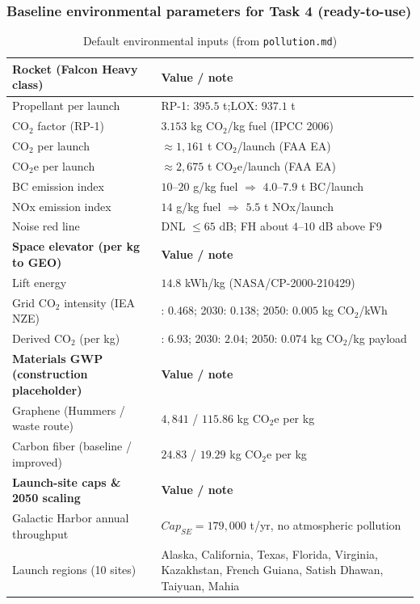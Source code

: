 ﻿\documentclass{mcmthesis}
\begin{document}
\subsubsection{Baseline environmental parameters for Task 4 (ready-to-use)}
\label{sec:task4_params}
\begin{table}[htbp]
\centering
\caption{Default environmental inputs (from \texttt{pollution.md})}
\label{tab:task4_params}
\renewcommand{\arraystretch}{1.08}
\begin{tabularx}{\textwidth}{@{}l >{\raggedright\arraybackslash}X@{}}
\toprule
\textbf{Rocket (Falcon Heavy class)} & \textbf{Value / note} \\
\midrule
Propellant per launch & RP-1: $395.5$ t;\quad LOX: $937.1$ t\\
CO$_2$ factor (RP-1) & $3.153$ kg CO$_2$/kg fuel (IPCC 2006)\\
CO$_2$ per launch & $\approx 1{,}161$ t CO$_2$/launch (FAA EA)\\
CO$_2$e per launch & $\approx 2{,}675$ t CO$_2$e/launch (FAA EA)\\
BC emission index & $10$--$20$ g/kg fuel $\Rightarrow$ $4.0$--$7.9$ t BC/launch\\
NOx emission index & $14$ g/kg fuel $\Rightarrow$ $5.5$ t NOx/launch\\
Noise red line & DNL $\le 65$ dB; FH about $4$--$10$ dB above F9 \\
\midrule
\textbf{Space elevator (per kg to GEO)} & \textbf{Value / note} \\
\midrule
Lift energy & $14.8$ kWh/kg (NASA/CP-2000-210429)\\
Grid CO$_2$ intensity (IEA NZE) & 2020: $0.468$; 2030: $0.138$; 2050: $0.005$ kg CO$_2$/kWh\\
Derived CO$_2$ (per kg) & 2020: $6.93$; 2030: $2.04$; 2050: $0.074$ kg CO$_2$/kg payload\\
\midrule
\textbf{Materials GWP (construction placeholder)} & \textbf{Value / note} \\
\midrule
Graphene (Hummers / waste route) & $4{,}841$ / $115.86$ kg CO$_2$e per kg \\
Carbon fiber (baseline / improved) & $24.83$ / $19.29$ kg CO$_2$e per kg \\
\midrule
\textbf{Launch-site caps \& 2050 scaling} & \textbf{Value / note} \\
\midrule
Galactic Harbor annual throughput & $Cap_{SE}=179{,}000$ t/yr, no atmospheric pollution \\
Launch regions (10 sites) & Alaska, California, Texas, Florida, Virginia, Kazakhstan, French Guiana, Satish Dhawan, Taiyuan, Mahia \\

\end{tabularx}
\end{table}
\end{document}
